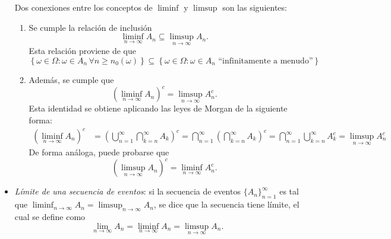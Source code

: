 \documentclass[a4paper]{report}
\begin{document}
\begin{itemize}
Dos conexiones entre los conceptos de \(\liminf\) y \(\limsup\) son las siguientes:
\begin{enumerate}
 \item Se cumple la relación de inclusión
 \[
 \liminf_{n\rightarrow \infty }A_n\subseteq\limsup_{n\rightarrow \infty }A_n.
 \]
 Esta relación proviene de que 
 \[
  \left\{\omega\in\Omega:\omega\in A_n\,\forall n\geq n_0(\omega)\right\}\subseteq\left\{\omega\in\Omega:\omega\in A_n \textrm{ ``infinitamente a menudo''}\right\}
 \]
 \item Además, se cumple que
 \[
  \left(\liminf_{n\rightarrow\infty}A_n\right)^c=\limsup_{n\rightarrow\infty}A_n^c.
 \]
 Esta identidad se obtiene aplicando las leyes de Morgan de la siguiente forma:
 \begin{align*}
  \left(\liminf_{n\rightarrow\infty}A_n\right)^c&=\left(\bigcup_{n=1}^{\infty }\bigcap_{k=n}^{\infty }A_k\right)^c=\bigcap_{n=1}^{\infty}\left(\bigcap_{k=n}^{\infty}A_k\right)^c=\bigcap_{n=1}^{\infty}\bigcup_{k=n}^{\infty}A_k^c=\limsup_{n\rightarrow\infty}A_n^c
 \end{align*}
 De forma análoga, puede probarse que
 \[
  \left(\limsup_{n\rightarrow\infty}A_n\right)^c=\liminf_{n\rightarrow\infty}A_n^c.
 \]
 \end{enumerate}
 \item \emph{Límite de una secuencia de eventos}: si la secuencia de eventos \(\{A_n\}_{n=1}^{\infty}\) es tal que \(\liminf_{n\rightarrow\infty}A_n=\limsup_{n\rightarrow\infty}A_n\), se dice que la secuencia tiene límite, el cual se define como
 \[
  \lim_{n\rightarrow\infty}A_n=\liminf_{n\rightarrow\infty}A_n=\limsup_{n\rightarrow\infty}A_n.
 \]
\end{itemize}
\end{document}
